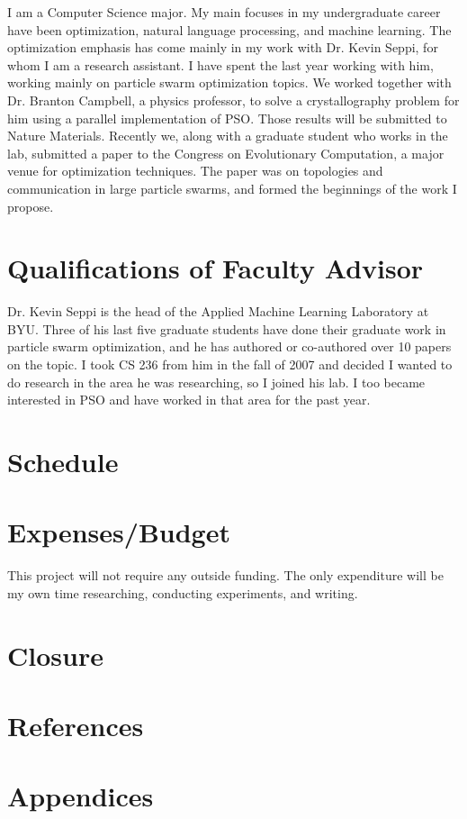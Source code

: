 \documentclass[onecolumn, 12pt]{article}
\begin{document}
I am a Computer Science major.  My main focuses in my undergraduate career have
been optimization, natural language processing, and machine learning.  The
optimization emphasis has come mainly in my work with Dr. Kevin Seppi, for whom
I am a research assistant.  I have spent the last year working with him,
working mainly on particle swarm optimization topics.  We worked together with
Dr. Branton Campbell, a physics professor, to solve a crystallography problem
for him using a parallel implementation of PSO.  Those results will be
submitted to Nature Materials.  Recently we, along with a graduate student who
works in the lab, submitted a paper to the Congress on Evolutionary
Computation, a major venue for optimization techniques.  The paper was on
topologies and communication in large particle swarms, and formed the
beginnings of the work I propose.

\section{Qualifications of Faculty Advisor}

Dr. Kevin Seppi is the head of the Applied Machine Learning Laboratory at BYU.
Three of his last five graduate students have done their graduate work in
particle swarm optimization, and he has authored or co-authored over 10 papers
on the topic.  I took CS 236 from him in the fall of 2007 and decided I wanted
to do research in the area he was researching, so I joined his lab.  I too
became interested in PSO and have worked in that area for the past year.

\section{Schedule}

\section{Expenses/Budget}

This project will not require any outside funding.  The only expenditure
will be my own time researching, conducting experiments, and writing.

\section{Closure}

\section{References}

\section{Appendices}
\end{document}

